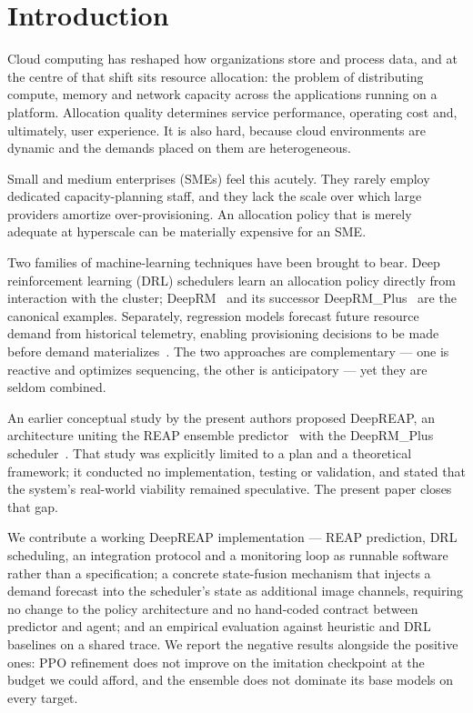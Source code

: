\documentclass[runningheads]{llncs}
\begin{document}
\section{Introduction}

Cloud computing has reshaped how organizations store and process data,
and at the centre of that shift sits resource allocation: the problem
of distributing compute, memory and network capacity across the
applications running on a platform. Allocation quality determines
service performance, operating cost and, ultimately, user experience.
It is also hard, because cloud environments are dynamic and the
demands placed on them are heterogeneous.

Small and medium enterprises (SMEs) feel this acutely. They rarely
employ dedicated capacity-planning staff, and they lack the scale over
which large providers amortize over-provisioning. An allocation policy
that is merely adequate at hyperscale can be materially expensive for
an SME.

Two families of machine-learning techniques have been brought to bear.
Deep reinforcement learning (DRL) schedulers learn an allocation
policy directly from interaction with the cluster; DeepRM~\cite{mao2016}
and its successor DeepRM\_Plus~\cite{guo2021} are the canonical
examples. Separately, regression models forecast future resource
demand from historical telemetry, enabling provisioning decisions to be
made before demand materializes~\cite{bankole2013,kaur2019}. The two
approaches are complementary --- one is reactive and optimizes
sequencing, the other is anticipatory --- yet they are seldom combined.

An earlier conceptual study by the present authors proposed DeepREAP,
an architecture uniting the REAP ensemble predictor~\cite{kaur2019}
with the DeepRM\_Plus scheduler~\cite{guo2021}. That study was
explicitly limited to a plan and a theoretical framework; it conducted
no implementation, testing or validation, and stated that the
system's real-world viability remained speculative. The present paper
closes that gap.

We contribute a working DeepREAP implementation --- REAP prediction,
DRL scheduling, an integration protocol and a monitoring loop as
runnable software rather than a specification; a concrete state-fusion
mechanism that injects a demand forecast into the scheduler's state as
additional image channels, requiring no change to the policy
architecture and no hand-coded contract between predictor and agent;
and an empirical evaluation against heuristic and DRL baselines on a
shared trace. We report the negative results alongside the positive
ones: PPO refinement does not improve on the imitation checkpoint at
the budget we could afford, and the ensemble does not dominate its
base models on every target.
\end{document}
